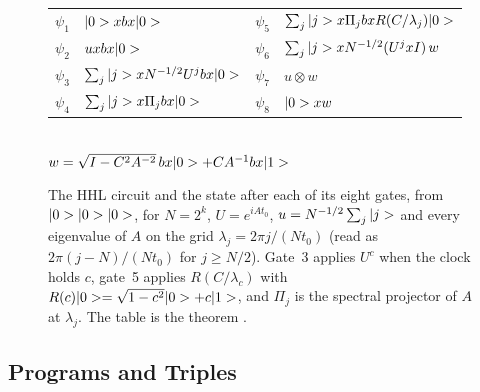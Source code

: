 \begin{figure}[t]
\centering
{}
\\[0.6em]
\renewcommand{\arraystretch}{1.15}\small
\begin{tabular}{@{}l@{\enspace}l@{\qquad}l@{\enspace}l@{}}
$\psi_1$ & $|0>x bx|0>$ &
$\psi_5$ & $\sum_j|j>x\Pi_jbx R(C/\lambda_j)|0>$\\
$\psi_2$ & $ux bx|0>$ &
$\psi_6$ & $\sum_j|j>x N^{-1/2}(U^{j}x I)\,w$\\
$\psi_3$ & $\sum_j|j>x N^{-1/2}U^{j}bx|0>$ &
$\psi_7$ & $u\otimes w$\\
$\psi_4$ & $\sum_j|j>x\Pi_jbx|0>$ &
$\psi_8$ & $|0>x w$
\end{tabular}\\[0.2em]
{\small $w=\sqrt{I-C^2A^{-2}}\,bx|0>+CA^{-1}bx|1>$}
\caption{The HHL circuit and the state after each of its eight gates, from $|0>|0>|0>$, for
$N=2^k$, $U=e^{iAt_0}$, $u=N^{-1/2}\sum_j|j>$ and every eigenvalue of $A$ on the grid
$\lambda_j=2\pi j/(Nt_0)$ (read as $2\pi(j-N)/(Nt_0)$ for $j\ge N/2$). Gate~3 applies $U^c$ when the
clock holds $c$, gate~5 applies $R(C/\lambda_c)$ with $R(c)|0>=\sqrt{1-c^2}|0>+c|1>$, and $\Pi_j$
is the spectral projector of $A$ at $\lambda_j$. The table is the theorem .}\label{fig:hhl}
\end{figure}

\subsection{Programs and Triples}

